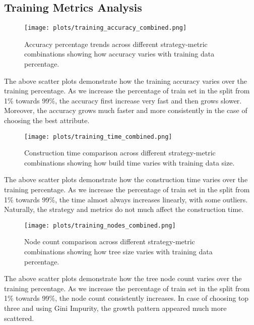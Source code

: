 \documentclass[12pt]{article}
\begin{document}
\newpage



\subsection{Training Metrics Analysis}

\begin{figure}[H]
    \centering
    \texttt{[image: plots/training\_accuracy\_combined.png]}
    \caption{Accuracy percentage trends across different strategy-metric combinations showing how accuracy varies with training data percentage.}
    \label{fig:training-accuracy}
\end{figure}

The above scatter plots demonstrate how the training accuracy varies over the training percentage. As we increase the percentage of train set in the split from 1\% towards 99\%, the accuracy first increase very fast and then grows slower. Moreover, the accuracy grows much faster and more consistently in the case of choosing the best attribute.

\newpage

\begin{figure}[H]
    \centering
    \texttt{[image: plots/training\_time\_combined.png]}
    \caption{Construction time comparison across different strategy-metric combinations showing how build time varies with training data size.}
    \label{fig:training-time}
\end{figure}

The above scatter plots demonstrate how the construction time varies over the training percentage. As we increase the percentage of train set in the split from 1\% towards 99\%, the time almost always increases linearly, with some outliers. Naturally, the strategy and metrics do not much affect the construction time.

\newpage

\begin{figure}[H]
    \centering
    \texttt{[image: plots/training\_nodes\_combined.png]}
    \caption{Node count comparison across different strategy-metric combinations showing how tree size varies with training data percentage.}
    \label{fig:training-nodes}
\end{figure}

The above scatter plots demonstrate how the tree node count varies over the training percentage. As we increase the percentage of train set in the split from 1\% towards 99\%, the node count consistently increases. In case of choosing top three and using Gini Impurity, the growth pattern appeared much more scattered.
\end{document}
